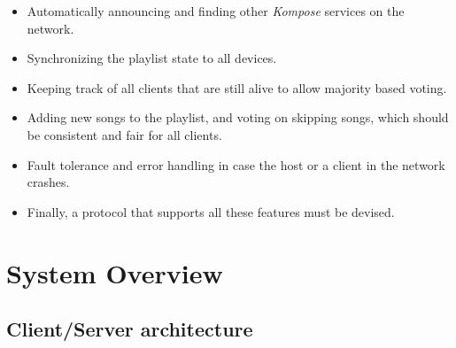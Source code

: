 \documentclass{report}
\begin{document}
\begin{itemize}
	\item Automatically announcing and finding other \emph{Kompose} services on the network.
	\item Synchronizing the playlist state to all devices.
	\item Keeping track of all clients that are still alive to allow majority based voting.
	\item Adding new songs to the playlist, and voting on skipping songs, which should be consistent and fair for all clients.
	\item Fault tolerance and error handling in case the host or a client in the network crashes.
	\item Finally, a protocol that supports all these features must be devised.
\end{itemize}
\newpage
\section{System Overview}
\subsection{Client/Server architecture}
\end{document}
